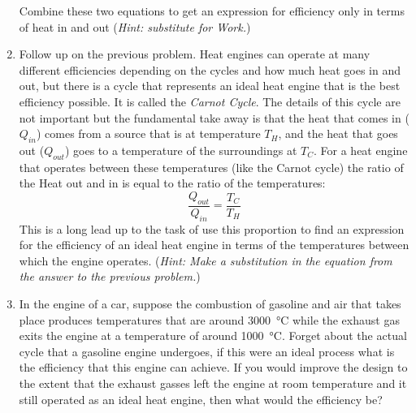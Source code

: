 \begin{enumerate}
Combine these two equations to get an expression for efficiency only in terms of heat in and out (\emph{Hint: substitute for Work.})

\item
Follow up on the previous problem. Heat engines can operate at many different efficiencies depending on the cycles and how much heat goes in and out, but there is a cycle that represents an ideal heat engine that is the best efficiency possible. It is called the \emph{Carnot Cycle}. The details of this cycle are not important but the fundamental take away is that the heat that comes in ($Q_{in}$) comes from a source that is at temperature $T_H$, and the heat that goes out ($Q_{out}$) goes to a temperature of the surroundings at $T_C$. For a heat engine that operates between these temperatures (like the Carnot cycle) the ratio of the Heat out and in is equal to the ratio of the temperatures: \[\frac{Q_{out}}{Q_{in}}=\frac{T_C}{T_H}\]
This is a long lead up to the task of use this proportion to find an expression for the efficiency of an ideal heat engine in terms of the temperatures between which the engine operates. (\emph{Hint: Make a substitution in the equation from the answer to the previous problem.})

\item
In the engine of a car, suppose the combustion of gasoline and air that takes place produces temperatures that are around \SI{3000}{\celsius} while the exhaust gas exits the engine at a temperature of around \SI{1000}{\celsius}. Forget about the actual cycle that a gasoline engine undergoes, if this were an ideal process what is the efficiency that this engine can achieve. If you would improve the design to the extent that the exhaust gasses left the engine at room temperature and it still operated as an ideal heat engine, then what would the efficiency be? 


\newpage 

\ %

\newpage

\end{enumerate}